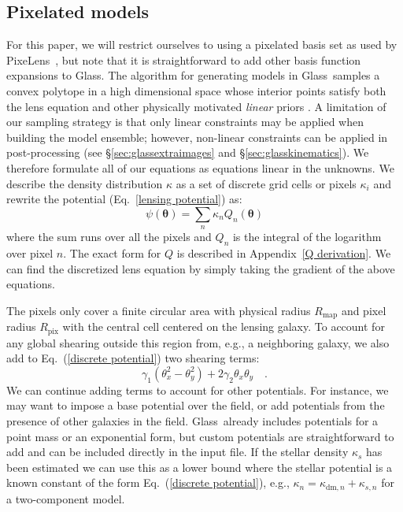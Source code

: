 \documentclass[galley,usenatbib]{mn2e}
\renewcommand{\vec}[1]{\ensuremath{\boldsymbol{#1}}}
\newcommand{\Glass}{{\sc Glass}}
\newcommand{\PixeLens}{{\sc PixeLens}}
\newcommand{\Rmap}{\ensuremath{R_\mathrm{map}}}
\newcommand{\Rpix}{\ensuremath{R_\mathrm{pix}}}
\newcommand{\eqnref}[1] {Eq.~(\ref{#1})}
\newcommand{\eqnrefp}[1] {(Eq.~\ref{#1})}
\newcommand{\secref}[1] {\S\ref{#1}}
\newcommand{\appref}[1] {Appendix~\ref{#1}}
\begin{document}
\subsection{Pixelated models}\label{sec:discrete}
For this paper, we will restrict ourselves to using a pixelated basis set as used by \PixeLens\ \citep{Saha2004,2008ApJ...679...17C}, but note that it is straightforward to add other basis function expansions to \Glass. The algorithm for generating models in
\Glass\ samples a convex polytope in a high dimensional space whose interior
points satisfy both the lens equation and other physically
motivated {\it linear} priors \citep{2012MNRAS.425.3077L}. A limitation of our sampling strategy is that only linear constraints may be applied when building the model ensemble; however, non-linear constraints can be applied in post-processing (see \secref{sec:glassextraimages} and \secref{sec:glasskinematics}). We therefore formulate all of our equations as
equations linear in the unknowns. We describe the density distribution $\kappa$
as a set of discrete grid cells or pixels $\kappa_i$ and rewrite the potential
\eqnrefp{lensing potential} as:
%
\begin{equation}
  \psi(\vec\theta) = \sum_n \kappa_n Q_n(\vec\theta)
  \label{discrete potential}
\end{equation}
%
where the sum runs over all the pixels and $Q_n$ is the integral of the
logarithm over pixel $n$. The exact form for $Q$ is described in \appref{Q
derivation}.  We can find the discretized lens equation by simply taking the
gradient of the above equations. 

The pixels only cover a finite circular area with physical radius $\Rmap$ and
pixel radius $\Rpix$ with the central cell centered on the lensing galaxy. To
account for any global shearing outside this region from, e.g., a neighboring
galaxy, we also add to \eqnref{discrete potential} two shearing terms:
%
\begin{equation}
\label{shear}
\gamma_1(\theta_x^2 - \theta_y^2) + 2\gamma_2\theta_x\theta_y\quad.
\end{equation}
%
We can continue adding terms to account for other potentials. For instance, we
may want to impose a base potential over the field, or add potentials from the
presence of other galaxies in the field. \Glass\ already includes potentials
for a point mass or an exponential form, but custom potentials are
straightforward to add and can be included directly in the input file.  If the
stellar density $\kappa_s$ has been estimated we can use this as a lower bound
where the stellar potential is a known constant of the form \eqnref{discrete
potential}, e.g., $\kappa_n = \kappa_{\mathrm{dm},n} + \kappa_{s,n}$ for a
two-component model.
\end{document}
